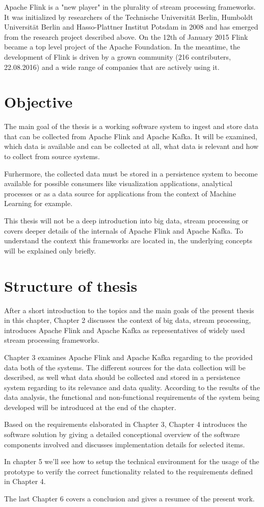 Apache Flink is a "new player" in the plurality of stream processing frameworks. It was
initialized by researchers of the Technische Universität Berlin, Humboldt Universität
Berlin and Hasso-Plattner Institut Potsdam in 2008 and has emerged from the research project described
above.  On the 12th of January 2015 Flink became a top level project of the Apache Foundation. In the
meantime, the development of Flink is driven by a grown community (216 contributers, 22.08.2016) and
a wide range of companies that are actively using it.

\section{Objective}

The main goal of the thesis is a working software system to ingest and store data that can be collected
from Apache Flink and Apache Kafka. It will be examined, which data is available and can be collected
at all, what data is relevant and how to collect from source systems.

Furhermore, the collected data must be stored in a persistence system to become available
for possible consumers like visualization applications, analytical processes or as a data
source for applications from the context of Machine Learning for example.

This thesis will not be a deep introduction into big data, stream processing or covers deeper
details of the internals of Apache Flink and Apache Kafka. To understand the context this
frameworks are located in, the underlying concepts will be explained only briefly.

\section{Structure of thesis}

After a short introduction to the topics and the main goals of the present thesis in this
chapter, Chapter 2 discusses the context of big data, stream processing, introduces Apache Flink and
Apache Kafka as representatives of widely used stream processing frameworks.

Chapter 3 examines Apache Flink and Apache Kafka regarding to the provided data both of the systems.
The different sources for the data collection will be described, as well what data should be collected
and stored in a persistence system regarding to its relevance and data quality. According to the results
of the data analysis, the functional and non-functional requirements of the system being developed will
be introduced at the end of the chapter.

Based on the requirements elaborated in Chapter 3, Chapter 4 introduces the software solution by
giving a detailed conceptional overview of the software components involved and discusses implementation
details for selected items.

In chapter 5 we'll see how to setup the technical environment for the usage of the prototype
to verify the correct functionality related to the requirements defined in Chapter 4.

The last Chapter 6 covers a conclusion and gives a resumee of the present work.